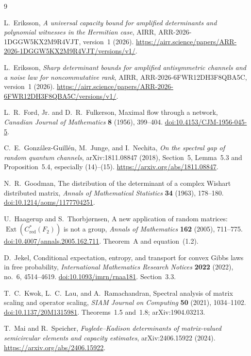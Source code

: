 \documentclass[11pt]{article}
\theoremstyle{remark}
\begin{document}
\begin{thebibliography}{9}

L.~Eriksson,
\emph{A universal capacity bound for amplified determinants and
polynomial witnesses in the Hermitian case},
AIRR, ARR-2026-1DGGW5KX2M9R4VJT, version~1 (2026).
\url{https://airr.science/papers/ARR-2026-1DGGW5KX2M9R4VJT/versions/v1/}.

L.~Eriksson,
\emph{Sharp determinant bounds for amplified antisymmetric channels
and a noise law for noncommutative rank},
AIRR, ARR-2026-6FWR12DH3F8QBA5C, version~1 (2026).
\url{https://airr.science/papers/ARR-2026-6FWR12DH3F8QBA5C/versions/v1/}.

L.~R.~Ford, Jr. and D.~R.~Fulkerson,
Maximal flow through a network,
\emph{Canadian Journal of Mathematics} \textbf{8} (1956), 399--404.
\href{https://doi.org/10.4153/CJM-1956-045-5}
     {doi:10.4153/CJM-1956-045-5}.

C.~E.~Gonz\'alez-Guill\'en, M.~Junge, and I.~Nechita,
\emph{On the spectral gap of random quantum channels},
arXiv:1811.08847 (2018), Section~5, Lemma~5.3 and
Proposition~5.4, especially (14)--(15).
\url{https://arxiv.org/abs/1811.08847}.

N.~R.~Goodman,
The distribution of the determinant of a complex Wishart
distributed matrix,
\emph{Annals of Mathematical Statistics} \textbf{34} (1963), 178--180.
\href{https://doi.org/10.1214/aoms/1177704251}
     {doi:10.1214/aoms/1177704251}.

U.~Haagerup and S.~Thorbj{\o}rnsen,
A new application of random matrices:
$\operatorname{Ext}(C^*_{\mathrm{red}}(F_2))$ is not a group,
\emph{Annals of Mathematics} \textbf{162} (2005), 711--775.
\href{https://doi.org/10.4007/annals.2005.162.711}
     {doi:10.4007/annals.2005.162.711}.
Theorem~A and equation~(1.2).

D.~Jekel,
Conditional expectation, entropy, and transport for convex Gibbs
laws in free probability,
\emph{International Mathematics Research Notices}
\textbf{2022} (2022), no.~6, 4514--4619.
\href{https://doi.org/10.1093/imrn/rnaa181}
     {doi:10.1093/imrn/rnaa181}.
Section~3.3.

T.~C.~Kwok, L.~C.~Lau, and A.~Ramachandran,
Spectral analysis of matrix scaling and operator scaling,
\emph{SIAM Journal on Computing} \textbf{50} (2021), 1034--1102.
\href{https://doi.org/10.1137/20M1315981}
     {doi:10.1137/20M1315981}.
Theorems~1.5 and~1.8; arXiv:1904.03213.

T.~Mai and R.~Speicher,
\emph{Fuglede--Kadison determinants of matrix-valued
semicircular elements and capacity estimates},
arXiv:2406.15922 (2024).
\url{https://arxiv.org/abs/2406.15922}.

\end{thebibliography}
\end{document}
